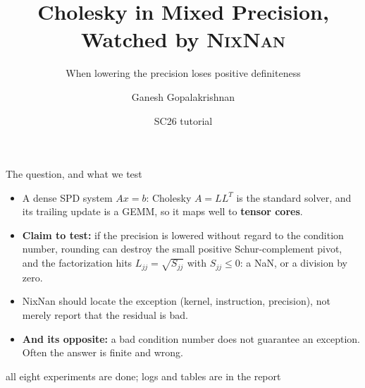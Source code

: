 \documentclass[aspectratio=169,10pt,xcolor=table]{beamer}
\title{Cholesky in Mixed Precision, Watched by \textsc{NixNan}}
\subtitle{When lowering the precision loses positive definiteness}
\author{Ganesh Gopalakrishnan}
\date{SC26 tutorial}
\begin{document}
\maketitle

\begin{frame}{The question, and what we test}
\small
\begin{itemize}
\item A dense SPD system $Ax=b$: Cholesky $A=LL^T$ is the standard solver, and its trailing update is a GEMM, so it maps well to \textbf{tensor cores}.
\item \textbf{Claim to test:} if the precision is lowered without regard to the condition number, rounding can destroy the small positive Schur-complement
pivot, and the factorization hits $L_{jj}=\sqrt{S_{jj}}$ with $S_{jj}\le 0$: a NaN, or a division by zero.
\item NixNan should locate the exception (kernel, instruction, precision), not merely report that the residual is bad.
\item \textbf{And its opposite:} a bad condition number does not guarantee an exception. Often the answer is finite and wrong.
\end{itemize}
\vspace{2mm}\centering
{}

{\scriptsize all eight experiments are done; logs and tables are in the report}
\end{frame}
\end{document}
